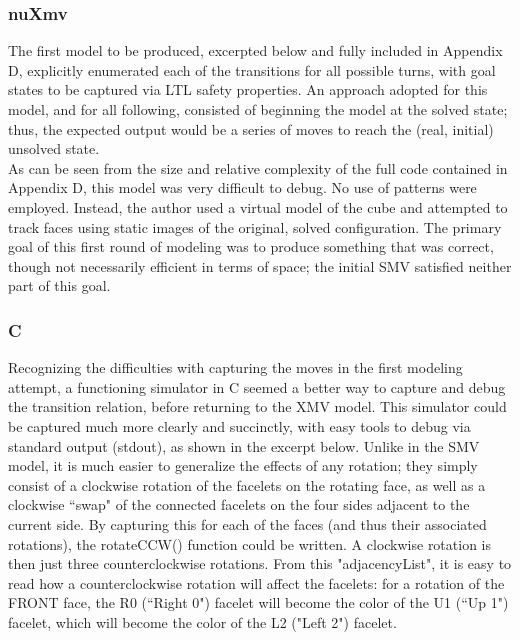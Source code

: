 \documentclass{article}
\begin{document}
\subsubsection {nuXmv}
The first model to be produced, excerpted below and fully included in Appendix D, explicitly enumerated each of the transitions for all possible turns, with goal states to be captured via LTL safety properties. An approach adopted for this model, and for all following, consisted of beginning the model at the solved state; thus, the expected output would be a series of moves to reach the (real, initial) unsolved state.\\

\noindent As can be seen from the size and relative complexity of the full code contained in Appendix D, this model was very difficult to debug. No use of patterns were employed. Instead, the author used a virtual model of the cube and attempted to track faces using static images of the original, solved configuration. The primary goal of this first round of modeling was to produce something that was correct, though not necessarily efficient in terms of space; the initial SMV satisfied neither part of this goal.

\vspace{0.3cm}


\subsubsection {C}
Recognizing the difficulties with capturing the moves in the first modeling attempt, a functioning simulator in C seemed a better way to capture and debug the transition relation, before returning to the XMV model. This simulator could be captured much more clearly and succinctly, with easy tools to debug via standard output (stdout), as shown in the excerpt below. Unlike in the SMV model, it is much easier to generalize the effects of any rotation; they simply consist of a clockwise rotation of the facelets on the rotating face, as well as a clockwise ``swap" of the connected facelets on the four sides adjacent to the current side. By capturing this for each of the faces (and thus their associated rotations), the rotateCCW() function could be written. A clockwise rotation is then just three counterclockwise rotations. From this "adjacencyList", it is easy to read how a counterclockwise rotation will affect the facelets: for a rotation of the FRONT face, the R0 (``Right 0") facelet will become the color of the U1 (``Up 1") facelet, which will become the color of the L2 ("Left 2") facelet.
\end{document}
